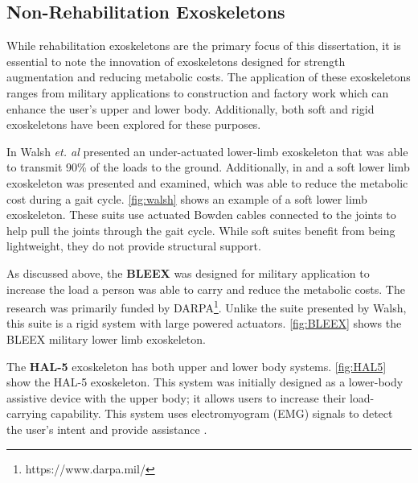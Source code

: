 \subsection{Non-Rehabilitation Exoskeletons}

While rehabilitation exoskeletons are the primary focus of this dissertation, it is essential to note the innovation of exoskeletons designed for strength augmentation and reducing metabolic costs. The application of these exoskeletons ranges from military applications to construction and factory work which can enhance the user's upper and lower body. Additionally, both soft and rigid exoskeletons have been explored for these purposes.

In \cite{walsh2006autonomous} Walsh \textit{et. al} presented an under-actuated lower-limb exoskeleton that was able to transmit 90\% of the loads to the ground. Additionally, in \cite{wehner2013lightweight} and \cite{asbeck2013biologically} a soft lower limb exoskeleton was presented and examined, which was able to reduce the metabolic cost during a gait cycle. \autoref{fig:walsh} shows an example of a soft lower limb exoskeleton. These suits use actuated Bowden cables connected to the joints to help pull the joints through the gait cycle. While soft suites benefit from being lightweight, they do not provide structural support.  



As discussed above, the \textbf{BLEEX} was designed for military application to increase the load a person was able to carry and reduce the metabolic costs. The research was primarily funded by DARPA\footnote{https://www.darpa.mil/}. Unlike the suite presented by Walsh, this suite is a rigid system with large powered actuators. \autoref{fig:BLEEX} shows the BLEEX military lower limb exoskeleton.


The \textbf{HAL-5} exoskeleton has both upper and lower body systems. \autoref{fig:HAL5} show the HAL-5 exoskeleton. This system was initially designed as a lower-body assistive device with the upper body; it allows users to increase their load-carrying capability. This system uses electromyogram (EMG) signals to detect the user's intent and provide assistance \cite{casolo2008active}.



